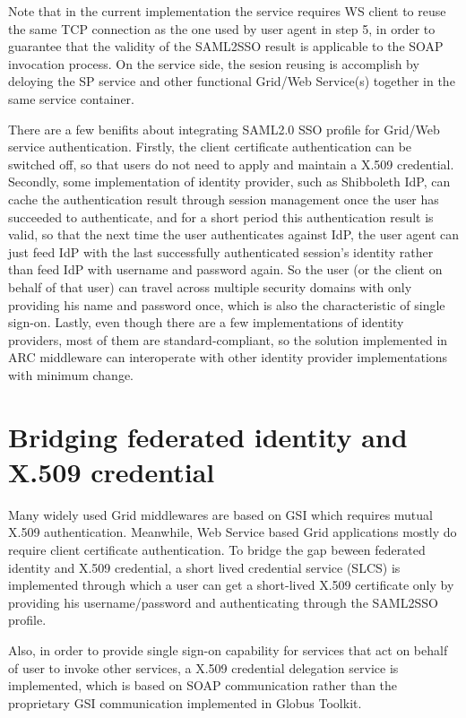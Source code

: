 \documentclass[conference]{IEEEtran}
\begin{document}
Note that in the current implementation the service requires WS client to reuse the same 
TCP connection as the one used by user agent in step 5, in order to guarantee that the validity of 
the SAML2SSO result is applicable to the SOAP invocation process. On the service side, 
the sesion reusing is accomplish by deloying the SP service and other functional Grid/Web Service(s) 
together in the same service container. 

There are a few benifits about integrating SAML2.0 SSO profile for Grid/Web service authentication. 
Firstly, the client certificate authentication can be switched off, so that users do not need 
to apply and maintain a X.509 credential. Secondly, some implementation of identity provider, such as 
Shibboleth IdP, can cache the authentication result through session management once the user
has succeeded to authenticate, and for a short period this authentication result is valid, so that 
the next time the user authenticates against IdP, the user agent can just feed IdP with the last 
successfully authenticated session's identity rather than feed IdP with username and password again. So 
the user (or the client on behalf of that user) can travel across multiple security domains with 
only providing his name and password once, which is also the characteristic of single sign-on.
Lastly, even though there are a few implementations of identity providers, most of them are 
standard-compliant, so the solution implemented in ARC middleware can interoperate with other 
identity provider implementations with minimum change.

\section{Bridging federated identity and X.509 credential}
\label{sec:fedidtoX509}
Many widely used Grid middlewares are based on GSI which requires mutual X.509 authentication. 
Meanwhile, Web Service based Grid applications mostly do require client certificate authentication.  
To bridge the gap beween federated identity and X.509 credential, a short lived credential 
service (SLCS) is implemented through which a user can get a short-lived X.509 certificate only by
providing his username/password and authenticating through the SAML2SSO profile.

Also, in order to provide single sign-on capability for services that act on behalf of user to 
invoke other services, a X.509 credential delegation service is implemented, which is based on 
SOAP communication rather than the proprietary GSI communication implemented in Globus Toolkit.
\end{document}
